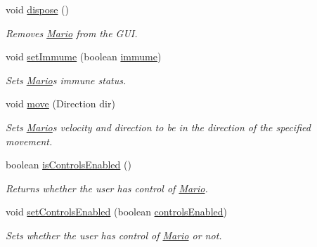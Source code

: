 \begin{DoxyCompactItemize}
\mbox{\label{classnl_1_1arjanfrans_1_1mario_1_1model_1_1Mario_a0a0c01da34e063939f6d50c43c8edda7}} 
void \hyperlink{classnl_1_1arjanfrans_1_1mario_1_1model_1_1Mario_a0a0c01da34e063939f6d50c43c8edda7}{dispose} ()
\begin{DoxyCompactList}\small\item\em Removes \hyperlink{classnl_1_1arjanfrans_1_1mario_1_1model_1_1Mario}{Mario} from the G\+UI. \end{DoxyCompactList}\item 
void \hyperlink{classnl_1_1arjanfrans_1_1mario_1_1model_1_1Mario_a4ff385372dd5b42110839b1c3a92e0c4}{set\+Immume} (boolean \hyperlink{classnl_1_1arjanfrans_1_1mario_1_1model_1_1Mario_a09b83e0286895f31f33418883c06ce01}{immume})
\begin{DoxyCompactList}\small\item\em Sets \hyperlink{classnl_1_1arjanfrans_1_1mario_1_1model_1_1Mario}{Mario}\textquotesingle{}s immune status. \end{DoxyCompactList}\item 
void \hyperlink{classnl_1_1arjanfrans_1_1mario_1_1model_1_1Mario_a4d82e5956168d3222d122854a17300dd}{move} (Direction dir)
\begin{DoxyCompactList}\small\item\em Sets \hyperlink{classnl_1_1arjanfrans_1_1mario_1_1model_1_1Mario}{Mario}\textquotesingle{}s velocity and direction to be in the direction of the specified movement. \end{DoxyCompactList}\item 
boolean \hyperlink{classnl_1_1arjanfrans_1_1mario_1_1model_1_1Mario_a3c4265e4764640c191e8177975feaf53}{is\+Controls\+Enabled} ()
\begin{DoxyCompactList}\small\item\em Returns whether the user has control of \hyperlink{classnl_1_1arjanfrans_1_1mario_1_1model_1_1Mario}{Mario}. \end{DoxyCompactList}\item 
void \hyperlink{classnl_1_1arjanfrans_1_1mario_1_1model_1_1Mario_aa396b035c909e03417db5f201d894e2f}{set\+Controls\+Enabled} (boolean \hyperlink{classnl_1_1arjanfrans_1_1mario_1_1model_1_1Mario_a5274108ef60b357abdca2e64b6378d58}{controls\+Enabled})
\begin{DoxyCompactList}\small\item\em Sets whether the user has control of \hyperlink{classnl_1_1arjanfrans_1_1mario_1_1model_1_1Mario}{Mario} or not. \end{DoxyCompactList}\end{DoxyCompactItemize}
